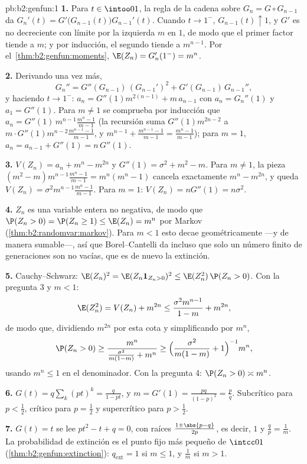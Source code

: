 \begin{solution}{pb:b2:genfun:1}
\textbf{1.} Para $t \in \intoo01$, la regla de la cadena sobre $G_n =
G \circ G_{n-1}$ da $G_n'(t) = G'\bigl(G_{n-1}(t)\bigr)G_{n-1}'(t)$.
Cuando $t \to 1^-$, $G_{n-1}(t) \uparrow 1$, y $G'$ es no decreciente
con límite por la izquierda $m$ en $1$, de modo que el primer factor
tiende a $m$; y por inducción, el segundo tiende a $m^{n-1}$. Por el~\cref{thm:b2:genfun:moments}, $\E(Z_n) = G_n'(1^-) = m^n$.

\textbf{2.} Derivando una vez más,
\[
G_n'' = G''(G_{n-1})\,(G_{n-1}')^2 +
G'(G_{n-1})\,G_{n-1}'',
\]
y haciendo $t \to 1^-$: $a_n = G''(1)m^{2(n-1)} + m\, a_{n-1}$ con
$a_n = G_n''(1)$ y $a_1 = G''(1)$. Para $m \neq 1$ se comprueba por
inducción que $a_n = G''(1)\,m^{n-1} \frac{m^n - 1}{m - 1}$ (la
recursión suma $G''(1)m^{2n-2}$ a $m\cdot
G''(1)m^{n-2}\frac{m^{n-1}-1}{m-1}$, y $m^{n-1} +
\frac{m^{n-1}-1}{m-1} = \frac{m^n - 1}{m-1}$); para $m = 1$, $a_n =
a_{n-1} + G''(1) = n\,G''(1)$.

\textbf{3.} $V(Z_n) = a_n + m^n - m^{2n}$ y $G''(1) = \sigma^2 + m^2
- m$. Para $m \neq 1$, la pieza $(m^2 -
m)m^{n-1}\frac{m^n-1}{m-1} = m^n(m^n - 1)$ cancela exactamente $m^n -
m^{2n}$, y queda $V(Z_n) = \sigma^2m^{n-1}\frac{m^n-1}{m-1}$. Para $m
= 1$: $V(Z_n) = nG''(1) = n\sigma^2$.

\textbf{4.} $Z_n$ es una variable entera no negativa, de modo que
$\P(Z_n > 0) = \P(Z_n \geq 1) \leq \E(Z_n) = m^n$ por Markov
(\cref{thm:b2:randomvar:markov}). Para $m < 1$ esto decae
geométricamente ---y de manera sumable---, así que Borel--Cantelli da
incluso que solo un número finito de generaciones son no vacías, que
es de nuevo la extinción.

\textbf{5.} Cauchy--Schwarz: $\E(Z_n)^2 = \E(Z_n\mathbf 1_{Z_n>0})^2
\leq \E(Z_n^2)\,\P(Z_n > 0)$. Con la pregunta 3 y $m < 1$:
\[
\E(Z_n^2) = V(Z_n) + m^{2n}
\leq \frac{\sigma^2m^{n-1}}{1-m} + m^{2n},
\]
de modo que, dividiendo $m^{2n}$ por esta cota y simplificando por
$m^n$,
\[
\P(Z_n > 0) \geq \frac{m^n}{\frac{\sigma^2}{m(1-m)} + m^n}
\geq \Bigl(\frac{\sigma^2}{m(1-m)} + 1\Bigr)^{-1}m^n ,
\]
usando $m^n \leq 1$ en el denominador. Con la pregunta 4: $\P(Z_n >
0) \asymp m^n$.

\textbf{6.} $G(t) = q\sum_k(pt)^k = \frac{q}{1 - pt}$, y $m = G'(1) =
\frac{pq}{(1-p)^2} = \frac pq$. Subcrítico para $p < \frac12$,
crítico para $p = \frac12$ y supercrítico para $p > \frac12$.

\textbf{7.} $G(t) = t$ se lee $pt^2 - t + q = 0$, con raíces
$\frac{1 \pm \abs{p - q}}{2p}$, es decir, $1$ y $\frac qp = \frac1m$.
La probabilidad de extinción es el punto fijo más pequeño de
$\intcc01$ (\cref{thm:b2:genfun:extinction}): $q_{\mathrm{ext}} = 1$
si $m \leq 1$, y $\frac1m$ si $m > 1$.


\end{solution}
